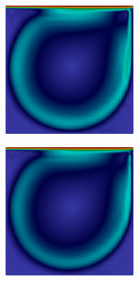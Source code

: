 \begin{figure}[h!]
\begin{subfigure}{\textwidth}
\begin{subfigure}{\textwidth}
\begin{subfigure}{.32\textwidth}
            \end{subfigure}
            \begin{subfigure}{.32\textwidth}
                \includegraphics[width=\linewidth]{Figuras/cavity-poor/VMS-Qua.png}
            \end{subfigure}
            \begin{subfigure}{.32\textwidth}
                \includegraphics[width=\linewidth]{Figuras/cavity-poor/VMS-TH.png}

\end{subfigure}
\end{subfigure}
\end{subfigure}
\end{figure}
